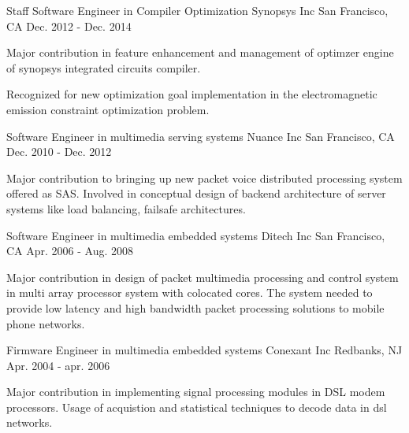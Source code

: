 \begin{cventries}
  \cventry
    {Staff Software Engineer in Compiler Optimization } %
    {Synopsys Inc} %
    {San Francisco, CA} %
    {Dec. 2012 - Dec. 2014} %
    {
      \begin{cvitems} %
        \item {Major contribution in feature enhancement and management of optimzer engine of synopsys integrated circuits compiler.}
        \item {Recognized for new optimization goal implementation in the electromagnetic emission constraint optimization problem.}
      \end{cvitems}
    }
  \cventry
    {Software Engineer in multimedia serving  systems } %
    {Nuance Inc} %
    {San Francisco, CA} %
    {Dec. 2010 - Dec. 2012} %
    {
      \begin{cvitems} %
        \item {Major contribution to bringing up new packet voice distributed processing system offered as SAS. Involved in conceptual design of backend architecture of server systems like load balancing, failsafe architectures.}
      \end{cvitems}
    }

  \cventry
    {Software Engineer in multimedia embedded  systems } %
    {Ditech Inc} %
    {San Francisco, CA} %
    {Apr. 2006 - Aug. 2008} %
    {
      \begin{cvitems} %
       \item {Major contribution in design of packet multimedia processing and control system in multi array processor system with colocated cores. The system needed to provide low latency and high bandwidth packet processing solutions to mobile phone networks.}
      \end{cvitems}
    }
  \cventry
    {Firmware Engineer in multimedia embedded  systems } %
    {Conexant Inc} %
    {Redbanks, NJ} %
    {Apr. 2004 - apr. 2006} %
    {
      \begin{cvitems} %
       \item {Major contribution in implementing signal processing modules in DSL modem processors. Usage of acquistion and statistical techniques to decode data in dsl networks.}
      \end{cvitems}
    }


\end{cventries}
